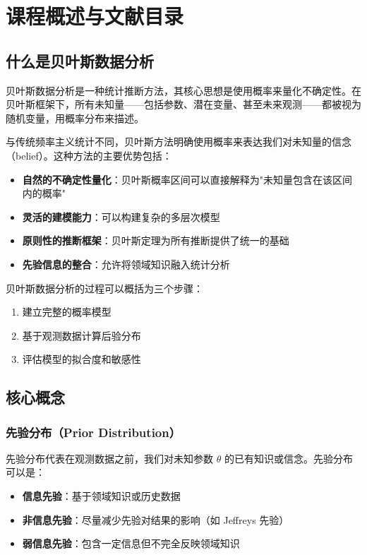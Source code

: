 
\chapter{课程概述与文献目录}\label{chap:introduction}

\section{什么是贝叶斯数据分析}

贝叶斯数据分析是一种统计推断方法，其核心思想是使用概率来量化不确定性。在贝叶斯框架下，所有未知量——包括参数、潜在变量、甚至未来观测——都被视为随机变量，用概率分布来描述。

与传统频率主义统计不同，贝叶斯方法明确使用概率来表达我们对未知量的信念（belief）。这种方法的主要优势包括：

\begin{itemize}
  \item \textbf{自然的不确定性量化}：贝叶斯概率区间可以直接解释为"未知量包含在该区间内的概率"
  \item \textbf{灵活的建模能力}：可以构建复杂的多层次模型
  \item \textbf{原则性的推断框架}：贝叶斯定理为所有推断提供了统一的基础
  \item \textbf{先验信息的整合}：允许将领域知识融入统计分析
\end{itemize}

贝叶斯数据分析的过程可以概括为三个步骤：
\begin{enumerate}
  \item 建立完整的概率模型
  \item 基于观测数据计算后验分布
  \item 评估模型的拟合度和敏感性
\end{enumerate}

\section{核心概念}

\subsection{先验分布（Prior Distribution）}

先验分布代表在观测数据之前，我们对未知参数 $\theta$ 的已有知识或信念。先验分布可以是：
\begin{itemize}
  \item \textbf{信息先验}：基于领域知识或历史数据
  \item \textbf{非信息先验}：尽量减少先验对结果的影响（如 Jeffreys 先验）
  \item \textbf{弱信息先验}：包含一定信息但不完全反映领域知识
\end{itemize}


